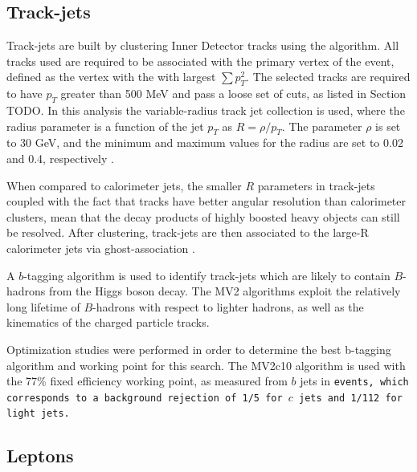 \subsection{Track-jets}
\label{sec:track_jets}
Track-jets are built by clustering Inner Detector tracks using the \akt algorithm.
All tracks used are required to be associated with the primary vertex of the event, defined as the vertex with the with largest $\sum p_T^2$.
The selected tracks are required to have $p_T$ greater than 500 MeV and pass a loose set of cuts, as listed in Section TODO.
In this analysis the variable-radius track jet collection is used, where the radius parameter is a function of the jet $p_{T}$ as $R=\rho/p_{T}$.
The parameter $\rho$ is set to 30 GeV, and the minimum and maximum values for the radius are set to 0.02 and 0.4, respectively \cite{ATL-PHYS-PUB-2017-010}.

When compared to calorimeter jets, the smaller $R$ parameters in track-jets coupled with the fact that tracks have better angular resolution than calorimeter clusters, mean that the decay products of highly boosted heavy objects can still be resolved.
After clustering, track-jets are then associated to the large-R calorimeter jets via ghost-association \cite{Cacciari:2008gn}.

A $b$-tagging algorithm is used to identify track-jets which are likely to contain $B$-hadrons from the Higgs boson decay. The MV2 algorithms exploit the relatively long lifetime of $B$-hadrons with respect to lighter hadrons, as well as the kinematics of the charged particle tracks.

Optimization studies were performed in order to determine the best b-tagging algorithm and working point for this search.
The MV2c10 algorithm is used with the 77\% fixed efficiency working point, as measured from $b$ jets in \tt events, which corresponds to a background rejection of 1/5 for $c$ jets and 1/112 for light jets.

\subsection{Leptons}
\label{sec:leptons}

